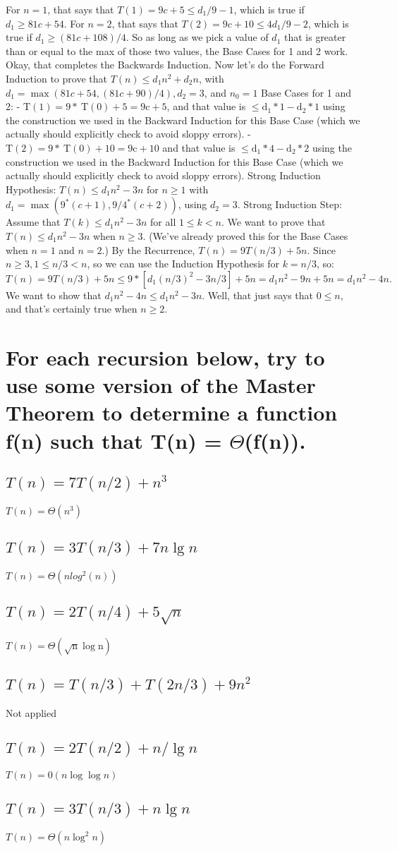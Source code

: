 \documentclass[a4paper]{article}
\begin{document}
For $n=1$,
that says that $T(1)=9 c+5 \leq d_1 / 9-1$, which is true if $d_1 \geq 81 c+54$. For $n=2$,
that says that $T(2)=9 c+10 \leq 4 d_1 / 9-2$, which is true if $d_1 \geq(81 c+108) / 4$.
So as long as we pick a value of $d_1$ that is greater than or equal to the max of those two values, the Base Cases for 1 and 2 work.
Okay, that completes the Backwards Induction. Now let's do the Forward Induction to prove that $T(n) \leq d_1 n^2+d_2 n$,
with $d_1=\max (81 c+54,(81 c+90) / 4), d_2=3$, and $n_0=1$
Base Cases for 1 and 2:
- $\mathrm{T}(1)=9 * \mathrm{~T}(0)+5=9 \mathrm{c}+5$, and that value is $\leq \mathrm{d}_1 * 1-\mathrm{d}_2 * 1$ using the construction we used in the Backward Induction for this Base Case (which we actually should explicitly check to avoid sloppy errors).
- $\mathrm{T}(2)=9 * \mathrm{~T}(0)+10=9 \mathrm{c}+10$ and that value is $\leq \mathrm{d}_1 * 4-\mathrm{d}_2 * 2$ using the construction we used in the Backward Induction for this Base Case (which we actually should explicitly check to avoid sloppy errors).
Strong Induction Hypothesis: $T(n) \leq d_1 n^2-3 n$ for $n \geq 1$
with $d_1=\max \left(9^*(c+1), 9 / 4^*(c+2)\right)$, using $d_2=3$.
Strong Induction Step:
Assume that $T(k) \leq d_1 n^2-3 n$ for all $1 \leq k<n$.
We want to prove that $T(n) \leq d_1 n^2-3 n$ when $n \geq 3$.
(We've already proved this for the Base Cases when $n=1$ and $n=2$.)
By the Recurrence, $T(n)=9 T(n / 3)+5 n$.
Since $n \geq 3,1 \leq n / 3<n$, so we can use the Induction Hypothesis for $k=n / 3$, so:
$$
T(n)=9 T(n / 3)+5 n \leq 9 *\left[d_1(n / 3)^2-3 n / 3\right]+5 n=d_1 n^2-9 n+5 n=d_1 n^2-4 n \text {. }
$$
We want to show that $d_1 n^2-4 n \leq d_1 n^2-3 n$.
Well, that just says that $0 \leq n$, and that's certainly true when $n \geq 2$.
\section{For each recursion below, try to use some version of the Master Theorem to determine a function f(n) such that T(n) = $\Theta$(f(n)).}

\subsection{$T(n)=7 T(n / 2)+n^3$}
$T(n)=\Theta(n^3)$
\subsection{$T(n)=3 T(n / 3)+7 n \lg n$}
$T(n)=\Theta(nlog^2(n))$
\subsection{$T(n)=2 T(n / 4)+5 \sqrt{n}$}
$T(n)=\Theta(\sqrt{\mathrm{n}} \log \mathrm{n})$
\subsection{$T(n)=T(n / 3)+T(2 n / 3)+9 n^2$}
Not applied
\subsection{$T(n)=2 T(n / 2)+n / \lg n$}
$T(n)=0(n \log \log n)$
\subsection{$T(n)=3 T(n / 3)+n \lg n$}
$T(n)=\Theta(n \log ^2 n)$
\end{document}
